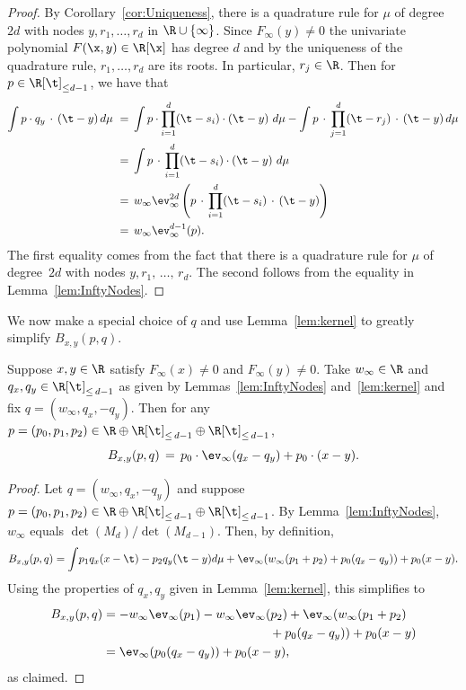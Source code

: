 \begin{proof}
By Corollary~\ref{cor:Uniqueness}, there is a quadrature rule for $\mu$ of degree~$2d$ with nodes $y, r_1,\hdots, r_d$ in $\R\cup \{\infty\}$. Since $F_{\infty}(y)\neq 0$ the univariate polynomial $F(\x,y)\in\R[\x]$ has degree $d$ and by the uniqueness of the quadrature rule, $r_1,\hdots, r_d$ are its roots. In particular, $r_j\in \R$. Then for $p\in \R[\t]_{\leq d-1}$, we have that
\begin{align*}
\int p \cdot q_y\,\cdot\,(\t-y) \, d\mu
\ &= \, \int p \cdot \prod_{i=1}^{d}(\t-s_i) \cdot (\t-y) \ d\mu - \int p\,\cdot\, \prod_{j=1}^d(\t-r_j)\,\cdot\,(\t-y) \, d\mu\\
&= \, \int p\,\cdot\,\prod_{i=1}^{d}(\t-s_i) \cdot (\t-y) \ d\mu\\
&= \, w_{\infty}\ev^{2d}_{\infty}\left(p \,\cdot\,\prod_{i=1}^{d}(\t-s_i)\,\cdot\,(\t-y)\right)\\
&= \, w_{\infty}\ev^{d-1}_{\infty}(p).
\end{align*}
The first equality comes from the fact that there is a quadrature rule for $\mu$ of degree~$2d$ with nodes $y,r_1,\,\hdots,\,r_d$. The second follows from the equality in Lemma~\ref{lem:InftyNodes}.
\end{proof}

We now make a special choice of $q$ and use Lemma~\ref{lem:kernel} to greatly simplify $B_{x,y}(p,q)$.

\begin{lemm}\label{lem:q}
Suppose $x,y\in \R$ satisfy $F_{\infty}(x)\neq0$ and $F_{\infty}(y)\neq0$. Take $w_\infty\in \R$ and $q_x, q_y\in \R[\t]_{\leq \,d-1}$ as given by Lemmas~\ref{lem:InftyNodes} and~\ref{lem:kernel} and fix $q = (w_{\infty}, q_x, -q_y)$. Then for any $p = (p_0, p_1, p_2)\in \R\oplus \R[\t]_{\leq\,d-1}\oplus \R[\t]_{\leq\,d-1}$,
\[
B_{x,y}(p,q) \, = \, p_0\cdot \ev_{\infty}(q_x-q_y) +p_0 \cdot (x-y).
\]
\end{lemm}


\begin{proof}
Let $q = (w_{\infty}, q_x, -q_y)$ and suppose $p = (p_0,p_1, p_2) \in \R \oplus \R[\t]_{\leq\,d-1} \oplus \R[\t]_{\leq\,d-1}$. By Lemma~\ref{lem:InftyNodes}, $w_{\infty} $ equals $\det(M_d)/\det(M_{d-1})$. Then, by definition,
\[
B_{x,y}(p,q) =\int \! p_1q_x (x-\t) - p_2q_y (\t-y) d\mu + \ev_{\infty}(w_{\infty}(p_1+p_2)+p_0(q_x-q_y)) +p_0(x-y).\\
\]
Using the properties of $q_x, q_y$ given in Lemma~\ref{lem:kernel}, this simplifies to
\begin{align*}
B_{x,y}(p,q)& = -w_{\infty}\ev_{\infty}(p_1) -w_{\infty} \ev_{\infty}(p_2) +\ev_{\infty}(w_{\infty}(p_1+p_2)\\
& \mkern 240mu +p_0(q_x-q_y)) +p_0(x-y)\\
& = \ev_{\infty}(p_0(q_x-q_y)) +p_0(x-y),
\end{align*}
as claimed.
\end{proof}

